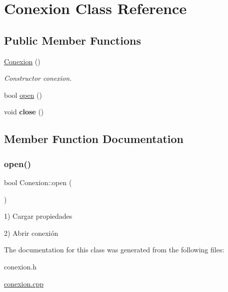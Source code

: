 \hypertarget{classConexion}{}\section{Conexion Class Reference}
\label{classConexion}
\subsection*{Public Member Functions}
\begin{DoxyCompactItemize}
\item 
\mbox{\label{classConexion_aba0281e06667725e147fa891e8a82fb3}} 
\mbox{\hyperlink{classConexion_aba0281e06667725e147fa891e8a82fb3}{Conexion}} ()
\begin{DoxyCompactList}\small\item\em Constructor conexion. \end{DoxyCompactList}\item 
bool \mbox{\hyperlink{classConexion_af697de4217c41446258b49844b4d85c1}{open}} ()
\item 
\mbox{\label{classConexion_ac83336bc48ea39ae47c2e8b0b10fba64}} 
void {\bfseries close} ()
\end{DoxyCompactItemize}


\subsection{Member Function Documentation}
\mbox{\label{classConexion_af697de4217c41446258b49844b4d85c1}} 
\subsubsection{\texorpdfstring{open()}{open()}}
{\footnotesize\ttfamily bool Conexion\+::open (\begin{DoxyParamCaption}{ }\end{DoxyParamCaption})}

1) Cargar propiedades

2) Abrir conexión 

The documentation for this class was generated from the following files\+:\begin{DoxyCompactItemize}
\item 
conexion.\+h\item 
\mbox{\hyperlink{conexion_8cpp}{conexion.\+cpp}}\end{DoxyCompactItemize}
